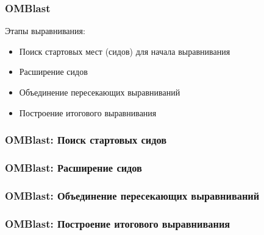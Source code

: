 \begin{frame}
\frametitle{OMBlast}
Этапы выравнивания:
\begin{center}

  \begin{itemize}
    \item Поиск стартовых мест (сидов) для начала выравнивания
    \item Расширение сидов
    \item Объединение пересекающих выравниваний
    \item Построение итогового выравнивания
  \end{itemize}

\end{center}
\end{frame}

\begin{frame}
\frametitle{OMBlast: Поиск стартовых сидов}

\end{frame}

\begin{frame}
\frametitle{OMBlast: Расширение сидов}

\end{frame}

\begin{frame}
\frametitle{OMBlast: Объединение пересекающих выравниваний}


\end{frame}

\begin{frame}
\frametitle{OMBlast: Построение итогового выравнивания}


\end{frame}

